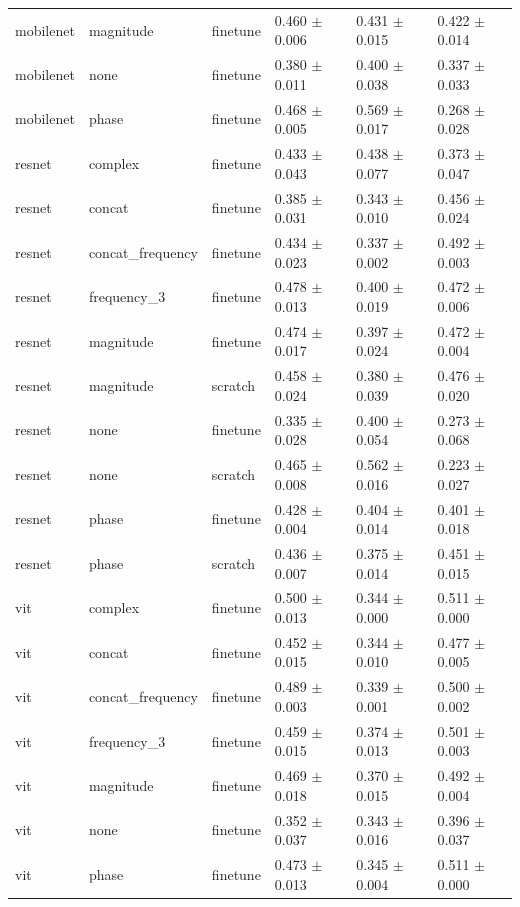 \begin{table}
\begin{tabular}{llllll}
mobilenet & magnitude & finetune & 0.460 $\pm$ 0.006 & 0.431 $\pm$ 0.015 & 0.422 $\pm$ 0.014 \\
mobilenet & none & finetune & 0.380 $\pm$ 0.011 & 0.400 $\pm$ 0.038 & 0.337 $\pm$ 0.033 \\
mobilenet & phase & finetune & 0.468 $\pm$ 0.005 & 0.569 $\pm$ 0.017 & 0.268 $\pm$ 0.028 \\
resnet & complex & finetune & 0.433 $\pm$ 0.043 & 0.438 $\pm$ 0.077 & 0.373 $\pm$ 0.047 \\
resnet & concat & finetune & 0.385 $\pm$ 0.031 & 0.343 $\pm$ 0.010 & 0.456 $\pm$ 0.024 \\
resnet & concat_frequency & finetune & 0.434 $\pm$ 0.023 & 0.337 $\pm$ 0.002 & 0.492 $\pm$ 0.003 \\
resnet & frequency_3 & finetune & 0.478 $\pm$ 0.013 & 0.400 $\pm$ 0.019 & 0.472 $\pm$ 0.006 \\
resnet & magnitude & finetune & 0.474 $\pm$ 0.017 & 0.397 $\pm$ 0.024 & 0.472 $\pm$ 0.004 \\
resnet & magnitude & scratch & 0.458 $\pm$ 0.024 & 0.380 $\pm$ 0.039 & 0.476 $\pm$ 0.020 \\
resnet & none & finetune & 0.335 $\pm$ 0.028 & 0.400 $\pm$ 0.054 & 0.273 $\pm$ 0.068 \\
resnet & none & scratch & 0.465 $\pm$ 0.008 & 0.562 $\pm$ 0.016 & 0.223 $\pm$ 0.027 \\
resnet & phase & finetune & 0.428 $\pm$ 0.004 & 0.404 $\pm$ 0.014 & 0.401 $\pm$ 0.018 \\
resnet & phase & scratch & 0.436 $\pm$ 0.007 & 0.375 $\pm$ 0.014 & 0.451 $\pm$ 0.015 \\
vit & complex & finetune & 0.500 $\pm$ 0.013 & 0.344 $\pm$ 0.000 & 0.511 $\pm$ 0.000 \\
vit & concat & finetune & 0.452 $\pm$ 0.015 & 0.344 $\pm$ 0.010 & 0.477 $\pm$ 0.005 \\
vit & concat_frequency & finetune & 0.489 $\pm$ 0.003 & 0.339 $\pm$ 0.001 & 0.500 $\pm$ 0.002 \\
vit & frequency_3 & finetune & 0.459 $\pm$ 0.015 & 0.374 $\pm$ 0.013 & 0.501 $\pm$ 0.003 \\
vit & magnitude & finetune & 0.469 $\pm$ 0.018 & 0.370 $\pm$ 0.015 & 0.492 $\pm$ 0.004 \\
vit & none & finetune & 0.352 $\pm$ 0.037 & 0.343 $\pm$ 0.016 & 0.396 $\pm$ 0.037 \\
vit & phase & finetune & 0.473 $\pm$ 0.013 & 0.345 $\pm$ 0.004 & 0.511 $\pm$ 0.000 \\

\end{tabular}
\end{table}
